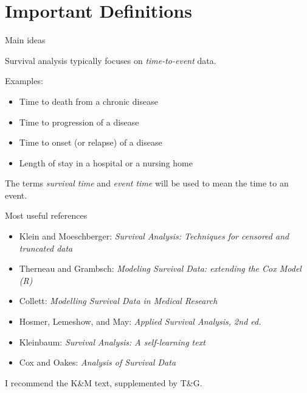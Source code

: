 \documentclass[ignorenonframetext,]{beamer}
\providecommand{\tightlist}{%
  \setlength{\itemsep}{0pt}\setlength{\parskip}{0pt}}
\begin{document}
\hypertarget{important-definitions}{%
\section{Important Definitions}\label{important-definitions}}

\begin{frame}{%
\protect\hypertarget{main-ideas}{%
Main ideas}}

Survival analysis typically focuses on \emph{time-to-event} data.

Examples:

\begin{itemize}
\tightlist
\item
  Time to death from a chronic disease
\item
  Time to progression of a disease
\item
  Time to onset (or relapse) of a disease
\item
  Length of stay in a hospital or a nursing home
\end{itemize}

The terms \emph{survival time} and \emph{event time} will be used to
mean the time to an event.

\end{frame}

\begin{frame}{%
\protect\hypertarget{most-useful-references}{%
Most useful references}}

\begin{itemize}
\tightlist
\item
  Klein and Moeschberger: \emph{Survival Analysis: Techniques for
  censored and truncated data}
\item
  Therneau and Grambsch: \emph{Modeling Survival Data: extending the Cox
  Model (R)}
\item
  Collett: \emph{Modelling Survival Data in Medical Research}
\item
  Hosmer, Lemeshow, and May: \emph{Applied Survival Analysis, 2nd ed.}
\item
  Kleinbaum: \emph{Survival Analysis: A self-learning text}
\item
  Cox and Oakes: \emph{Analysis of Survival Data}
\end{itemize}

I recommend the K\&M text, supplemented by T\&G.

\end{frame}
\end{document}
